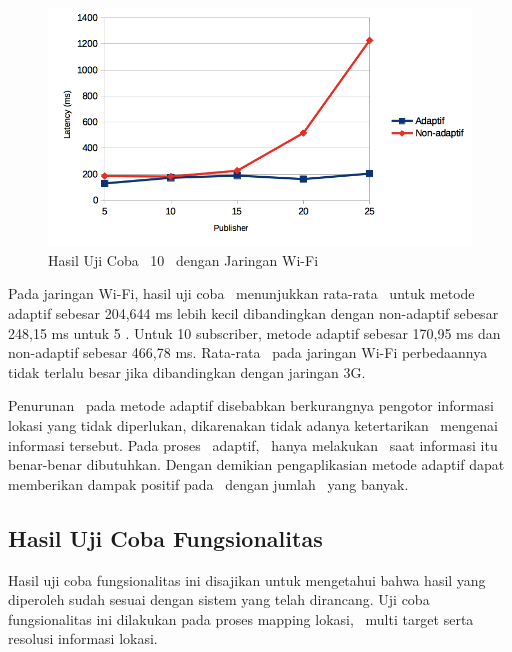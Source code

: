 \begin{figure}
  \centering
  \includegraphics[scale=0.90]
	{images/4-latency10.png}
	\caption{Hasil Uji Coba \Latency~10 \Subscriber~dengan Jaringan Wi-Fi}
\label{fig:latency_10}
\end{figure}

Pada jaringan Wi-Fi, hasil uji coba \latency~menunjukkan rata-rata
\latency~untuk metode adaptif sebesar 204,644 ms lebih kecil dibandingkan
dengan non-adaptif sebesar 248,15 ms untuk 5 \subscriber. Untuk 10 subscriber,
metode adaptif sebesar 170,95 ms dan non-adaptif sebesar 466,78 ms. Rata-rata
\latency~pada jaringan Wi-Fi perbedaannya tidak terlalu besar jika dibandingkan
dengan jaringan 3G.

Penurunan \latency~pada metode adaptif disebabkan berkurangnya pengotor
informasi lokasi yang tidak diperlukan, dikarenakan tidak adanya ketertarikan
\subscriber~mengenai informasi tersebut. Pada proses \tracking~adaptif,
\publisher~hanya melakukan \publish~saat informasi itu benar-benar dibutuhkan.
Dengan demikian pengaplikasian metode adaptif dapat memberikan dampak positif
pada \tracking~dengan jumlah \publisher~yang banyak.



\subsection{Hasil Uji Coba Fungsionalitas}

Hasil uji coba fungsionalitas ini disajikan untuk mengetahui bahwa hasil yang
diperoleh sudah sesuai dengan sistem yang telah dirancang. Uji coba
fungsionalitas ini dilakukan pada proses mapping lokasi, \tracking~multi target
serta resolusi informasi lokasi.

